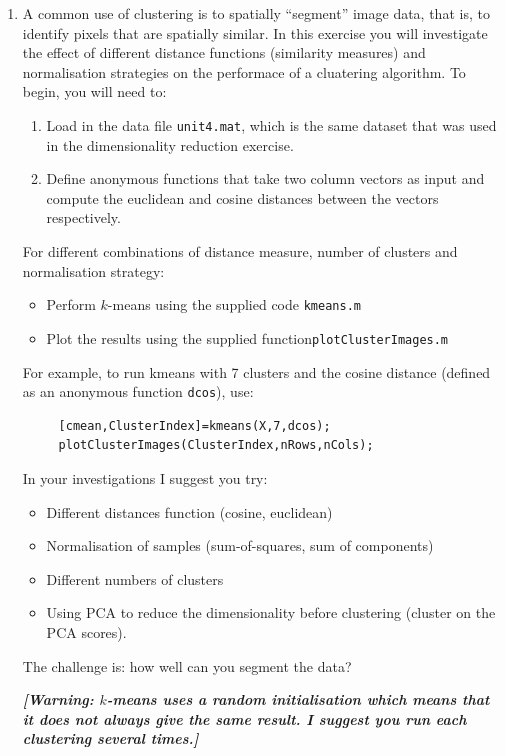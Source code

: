\documentclass[12pt,a4paper]{tufte-handout}
\begin{document}
\begin{enumerate}
  \item A common use of clustering is to spatially ``segment'' image data, that is, to identify pixels that are spatially similar. In this exercise you will investigate the effect of different distance functions (similarity measures) and normalisation strategies on the performace of a cluatering algorithm. To begin, you will need to:

    \begin{enumerate}
      \item Load in the data file \texttt{unit4.mat}, which is the same dataset that was used in the dimensionality reduction exercise.
      \item Define anonymous functions that take two column vectors as input and compute the euclidean and cosine distances between the vectors respectively.
    \end{enumerate}

    For different combinations of distance measure, number of clusters and normalisation strategy:
    \begin{itemize}
      \item Perform $k$-means using the supplied code \texttt{kmeans.m}
      \item Plot the results using the supplied function\texttt{plotClusterImages.m}
    \end{itemize}

    For example, to run kmeans with 7 clusters and the cosine distance (defined as an anonymous function \texttt{dcos}), use:
   \begin{lstlisting}
     [cmean,ClusterIndex]=kmeans(X,7,dcos);
     plotClusterImages(ClusterIndex,nRows,nCols);
   \end{lstlisting}

    In your investigations I suggest you try:
    \begin{itemize}
      \item Different distances function (cosine, euclidean)
      \item Normalisation of samples (sum-of-squares, sum of components)
      \item Different numbers of clusters
      \item Using PCA to reduce the dimensionality before clustering (cluster on the PCA scores).
    \end{itemize}
    
    The challenge is: how well can you segment the data?

   \textit{\textbf{[Warning: $k$-means uses a random initialisation which means that it does not always give the same result. I suggest you run each clustering several times.]}}
\end{enumerate}
      
\end{document}
